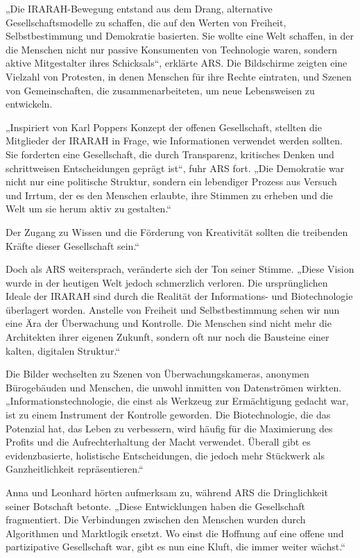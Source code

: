 \documentclass[
]{article}
\begin{document}
„Die IRARAH-Bewegung entstand aus dem Drang, alternative
Gesellschaftsmodelle zu schaffen, die auf den Werten von Freiheit,
Selbstbestimmung und Demokratie basierten. Sie wollte eine Welt
schaffen, in der die Menschen nicht nur passive Konsumenten von
Technologie waren, sondern aktive Mitgestalter ihres Schicksals``,
erklärte ARS. Die Bildschirme zeigten eine Vielzahl von Protesten, in
denen Menschen für ihre Rechte eintraten, und Szenen von Gemeinschaften,
die zusammenarbeiteten, um neue Lebensweisen zu entwickeln.

„Inspiriert von Karl Poppers Konzept der offenen Gesellschaft, stellten
die Mitglieder der IRARAH in Frage, wie Informationen verwendet werden
sollten. Sie forderten eine Gesellschaft, die durch Transparenz,
kritisches Denken und schrittweisen Entscheidungen geprägt ist``, fuhr
ARS fort. „Die Demokratie war nicht nur eine politische Struktur,
sondern ein lebendiger Prozess aus Versuch und Irrtum, der es den
Menschen erlaubte, ihre Stimmen zu erheben und die Welt um sie herum
aktiv zu gestalten.``

Der Zugang zu Wissen und die Förderung von Kreativität sollten die
treibenden Kräfte dieser Gesellschaft sein.``

Doch als ARS weitersprach, veränderte sich der Ton seiner Stimme. „Diese
Vision wurde in der heutigen Welt jedoch schmerzlich verloren. Die
ursprünglichen Ideale der IRARAH sind durch die Realität der
Informations- und Biotechnologie überlagert worden. Anstelle von
Freiheit und Selbstbestimmung sehen wir nun eine Ära der Überwachung und
Kontrolle. Die Menschen sind nicht mehr die Architekten ihrer eigenen
Zukunft, sondern oft nur noch die Bausteine einer kalten, digitalen
Struktur.``

Die Bilder wechselten zu Szenen von Überwachungskameras, anonymen
Bürogebäuden und Menschen, die unwohl inmitten von Datenströmen wirkten.
„Informationstechnologie, die einst als Werkzeug zur Ermächtigung
gedacht war, ist zu einem Instrument der Kontrolle geworden. Die
Biotechnologie, die das Potenzial hat, das Leben zu verbessern, wird
häufig für die Maximierung des Profits und die Aufrechterhaltung der
Macht verwendet. Überall gibt es evidenzbasierte, holistische
Entscheidungen, die jedoch mehr Stückwerk als Ganzheitlichkeit
repräsentieren.``

Anna und Leonhard hörten aufmerksam zu, während ARS die Dringlichkeit
seiner Botschaft betonte. „Diese Entwicklungen haben die Gesellschaft
fragmentiert. Die Verbindungen zwischen den Menschen wurden durch
Algorithmen und Marktlogik ersetzt. Wo einst die Hoffnung auf eine
offene und partizipative Gesellschaft war, gibt es nun eine Kluft, die
immer weiter wächst.``
\end{document}
